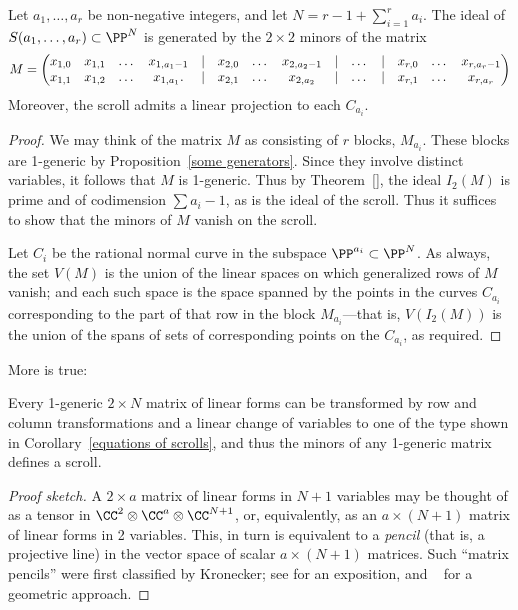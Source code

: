 \begin{corollary}\label{equations of scrolls} Let $a_{1}, \dots, a_{r}$ be non-negative integers, and let $N = r-1+\sum_{i=1}^{r} a_{i}$.
The ideal of $S(a_{1},\dots,a_{r})\subset \PP^{N}$ is generated by the $2\times 2$ minors of the matrix
{\footnotesize
$$
\setcounter{MaxMatrixCols}{20}
M = \begin{pmatrix}
x_{1,0}&x_{1,1}&\dots&x_{1, a_{1}-1}&|&x_{2,0}&\dots&x_{2, a_{2}-1}&|&\dots&|&x_{r,0}&\dots&x_{r, a_{r}-1}\\
x_{1,1}&x_{1,2}&\dots&x_{1, a_{1}}.  &|&x_{2,1}&\dots&x_{2, a_{2}}&|&\dots&|&x_{r,1}&\dots&x_{r, a_{r}}
\end{pmatrix}
$$
}
Moreover, the scroll admits a linear projection to each $C_{a_i}$.
\end{corollary}

\begin{proof} We may think of the matrix $M$ as consisting of $r$ blocks, $M_{a_{i}}$. These blocks are 1-generic by Proposition~\ref{some generators}. Since they involve distinct variables, it follows that $M$ is 1-generic. Thus by
Theorem~\ref{}, the ideal $I_{2}(M)$ is prime and of codimension $\sum a_{i}-1$, as is the ideal of the scroll. Thus it suffices to show that the minors of $M$ vanish on the scroll.

Let $C_{i}$ be the rational normal curve in the subspace $\PP^{a_{i}}\subset\PP^{N}$.
As always, the set $V(M)$ is the union of the linear spaces on which generalized rows of $M$ vanish; and each such space is the space spanned by the points in the curves $C_{a_{i}}$ corresponding to the part of that row in the block $M_{a_{i}}$---that is, $V(I_{2}(M))$ is the union of the spans of sets of corresponding points on the $C_{a_{i}}$, as required.
\end{proof}

More is true: 
\begin{theorem}\label{matrix pencils}
 Every
 1-generic $2 \times N$ matrix of linear forms can be transformed by row and column transformations and a linear change
 of variables to one of the type shown in
Corollary~\ref{equations of scrolls}, and thus the minors of any 1-generic matrix defines a scroll. 
\end{theorem}

\begin{proof}[Proof sketch]
A $2\times a$ matrix of linear forms in $N+1$ variables may be thought of as a tensor
in $\CC^{2}\otimes \CC^{a}\otimes \CC^{N+1}$, or, equivalently, as an $a\times (N+1)$ matrix of linear forms in 2 variables. This, in turn is equivalent to a \emph{pencil} (that is, a projective line) in the vector space of scalar $a\times (N+1)$ matrices. Such ``matrix pencils'' were first classified by Kronecker; see 
\cite[Theorems *** and ***]{Gantmacher} for an exposition, and ~\cite{Eisenbud-Harris-Centennial} for a geometric approach.
\end{proof}




